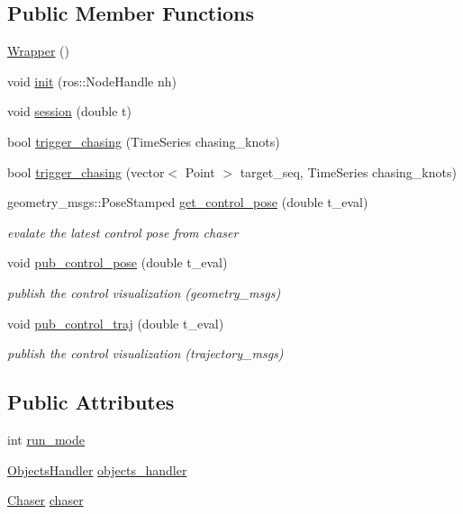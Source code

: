 \subsection*{Public Member Functions}
\begin{DoxyCompactItemize}
\item 
\hyperlink{class_wrapper_aa40ce9fcba8ab60bf01bcb0913144b4a}{Wrapper} ()
\item 
void \hyperlink{class_wrapper_af336781e7d75d525e7b152366a0e0d93}{init} (ros\+::\+Node\+Handle nh)
\item 
void \hyperlink{class_wrapper_a009ee5c325926f92df42319d5469a376}{session} (double t)
\item 
bool \hyperlink{class_wrapper_a21a0e115ea80e053e4f2defd1362b92f}{trigger\+\_\+chasing} (Time\+Series chasing\+\_\+knots)
\item 
bool \hyperlink{class_wrapper_a2da6448c77dd4edb054de4130b1fc883}{trigger\+\_\+chasing} (vector$<$ Point $>$ target\+\_\+seq, Time\+Series chasing\+\_\+knots)
\item 
geometry\+\_\+msgs\+::\+Pose\+Stamped \hyperlink{class_wrapper_ac2338df9e7b31f3291ed1cbd137a6f14}{get\+\_\+control\+\_\+pose} (double t\+\_\+eval)
\begin{DoxyCompactList}\small\item\em evalate the latest control pose from chaser \end{DoxyCompactList}\item 
void \hyperlink{class_wrapper_a94a786272ea8120469cb476d021c5b76}{pub\+\_\+control\+\_\+pose} (double t\+\_\+eval)
\begin{DoxyCompactList}\small\item\em publish the control visualization (geometry\+\_\+msgs) \end{DoxyCompactList}\item 
void \hyperlink{class_wrapper_a7f0e09c8a675991a3c987e41c6b9ff9d}{pub\+\_\+control\+\_\+traj} (double t\+\_\+eval)
\begin{DoxyCompactList}\small\item\em publish the control visualization (trajectory\+\_\+msgs) \end{DoxyCompactList}\end{DoxyCompactItemize}
\subsection*{Public Attributes}
\begin{DoxyCompactItemize}
\item 
int \hyperlink{class_wrapper_a4b4e8407edf38f99eb9d5a0cd4a0116b}{run\+\_\+mode}
\item 
\hyperlink{class_objects_handler}{Objects\+Handler} \hyperlink{class_wrapper_a8cddd5ffbaeb5ab0b5d8d8d0c74f810f}{objects\+\_\+handler}
\item 
\hyperlink{class_chaser}{Chaser} \hyperlink{class_wrapper_a750309ad3470e20a80e9d72b0d7e34cb}{chaser}
\end{DoxyCompactItemize}


